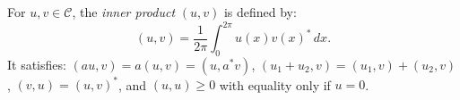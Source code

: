 For $u, v \in \mathcal{C}$, the \textit{inner product} $(u, v)$ is defined by:
\[
(u, v) = \frac{1}{2\pi} \int_0^{2\pi} u(x)v(x)^* \, dx.
\]
It satisfies: $(au, v) = a(u, v) = (u, a^*v)$, $(u_1+u_2, v) = (u_1, v)+(u_2, v)$, $(v, u) = (u, v)^*$, and $(u, u) \geq 0$ with equality only if $u = 0$.
